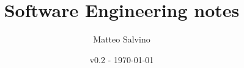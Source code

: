 \documentclass[11pt]{article}
\title{Software Engineering notes}
\author{Matteo Salvino}
\date{v0.2 - \today}
\begin{document}
\maketitle
\pagebreak
\tableofcontents
\pagebreak









\begin{appendix}
    
    
\end{appendix}
\end{document}
